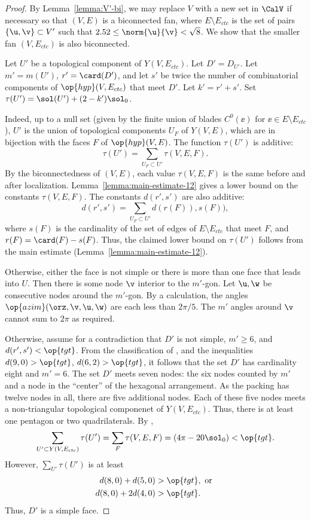 \begin{proof}
  By Lemma~\ref{lemma:V'-bi}, we may replace $V$ with a new set in
  $\CalV$ if necessary so that $(V,E)$ is a biconnected fan, where
  $E\setminus E_{ctc}$ is the set of pairs $\{\u,\v\}\subset V'$ such
  that $2.52\le\norm{\u}{\v} <\sqrt8$.  We  show that the smaller
  fan $(V,E_{ctc})$ is also biconnected.

  Let $U'$ be a topological component of $Y(V,E_{ctc})$.  Let
  $D'=D_{U'}$.  Let $m'=m(U')$, $r' = \card(D')$, and let $s'$ be
  twice the number of combinatorial components of
  $\op{hyp}(V,E_{ctc})$ that meet $D'$.  Let $k'=r'+s'$.  Set
  $\tau(U') = \sol(U') + (2-k')\sol_0$.

  Indeed,
up to a null set (given by the finite union of blades $C^0(\ee)$ for
$\ee\in E\setminus E_{ctc}$), $U'$ is the union of topological
components $U_F$ of $Y(V,E)$, which are in bijection with the faces
$F$ of $\op{hyp}(V,E)$.  The function $\tau(U')$ is additive:
\[
\tau(U') = \sum_{U_F\subset U'} \tau(V,E,F).
\]
By the biconnectedness of $(V,E)$, each value $\tau(V,E,F)$ is the
same before and after localization.
Lemma~\ref{lemma:main-estimate-12} gives a lower bound on the
constants $\tau(V,E,F)$.  The constants $d(r',s')$ are also additive:
\[
d(r',s') = \sum_{U_F\subset U'} d(r(F)),s(F)),
\]
where $s(F)$ is the cardinality of the set of edges of $E\setminus
E_{ctc}$ that meet $F$, and $r(F) = \card(F)-s(F)$.  Thus, the claimed
lower bound on $\tau(U')$ follows from the main estimate
(Lemma~\ref{lemma:main-estimate-12}).


 Otherwise, either
the face is not simple or there is more than one face that leads into
$U$.  Then there is some node $\v$ interior to the $m'$-gon.  Let
$\u,\w$ be consecutive nodes around the $m'$-gon.  By a
calculation, %
the angles $\op{azim}(\orz,\v,\u,\w)$ are each less than $2\pi/5$. The
$m'$ angles around $\v$ cannot sum to $2\pi$ as required.

  Otherwise, assume for a contradiction
that $D'$ is not simple, $m'\ge 6$, and $d(r',s')<\op{tgt}$.  From the
classification of \cite[p.~126,~Fig.~12.1]{Hales:2006:DCG}, and the
inequalities $d(9,0) > \op{tgt}$, $d(6,2) > \op{tgt}$, it follows that
the set $D'$ has cardinality eight and $m'=6$.  The set $D'$ meets seven
nodes: the six nodes counted by $m'$ and a node in the ``center'' of
the hexagonal arrangement.  As the packing has twelve nodes in all,
there are five additional nodes.  Each of these five nodes meets a
non-triangular topological componenet of $Y(V,E_{ctc})$.  Thus, there
is at least one pentagon or two quadrilaterals.  By ,
\[
  \sum_{U'\subset Y(V,E_{ctc})} \tau(U') 
=\sum_F \tau(V,E,F) = (4\pi - 20\sol_0) < \op{tgt}.
\]
However, $\sum_{U'} \tau(U')$ is at least
\begin{align*}
d(8,0) + d(5,0) &> \op{tgt}, \text{ or }\\
d(8,0) + 2 d(4,0) &> \op{tgt}.
\end{align*}
Thus, $D'$ is a simple face.
%
%


\end{proof}
